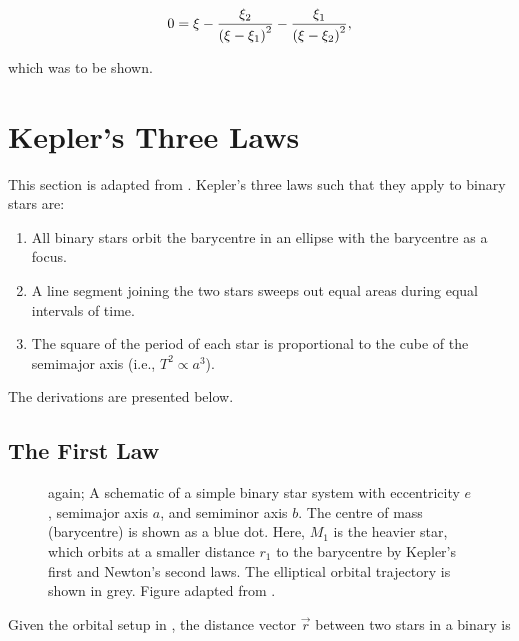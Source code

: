 \begin{tcolorbox}[enhanced,title={The formula for the Roche lobes of binary stars.}]
    \begin{equation}
        0=\xi-\frac{\xi_2}{\left(\xi-\xi_1\right)^2}-\frac{\xi_1}{\left(\xi-\xi_2\right)^2},
    \end{equation}
\end{tcolorbox}

which was to be shown.

\section{Kepler's Three Laws}\label{chap:keplers_laws}

This section is adapted from \citet{Richards:2021}. Kepler's three laws such that they apply to binary stars are:

\begin{enumerate}
    \item All binary stars orbit the barycentre in an ellipse with the barycentre as a focus.
    \item A line segment joining the two stars sweeps out equal areas during equal intervals of time.
    \item The square of the period of each star is proportional to the cube of the semimajor axis (i.e., $T^2\propto a^3$).
\end{enumerate}

The derivations are presented below.

\subsection{The First Law}\label{sec:keplers_first_law}

\begin{figure}[!htbp]
    \centering
    
    \caption[A schematic of a simple binary star system.]{ again; A schematic of a simple binary star system with eccentricity $e$, semimajor axis $a$, and semiminor axis $b$. The centre of mass (barycentre) is shown as a blue dot. Here, $M_1$ is the heavier star, which orbits at a smaller distance $r_1$ to the barycentre by Kepler's first and Newton's second laws. The elliptical orbital trajectory is shown in grey. Figure adapted from \citet{Richards:2021}.}
    \label{fig:bss_schematic_appendix}
\end{figure}

Given the orbital setup in , the distance vector $\vec{r}$ between two stars in a binary is

